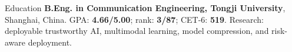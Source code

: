 \begin{rubric}{Education}
\entry*[2023 -- Present]%
  \textbf{B.Eng. in Communication Engineering, Tongji University}, Shanghai, China. GPA: \textbf{4.66/5.00}; rank: \textbf{3/87}; CET-6: \textbf{519}. Research: deployable trustworthy AI, multimodal learning, model compression, and risk-aware deployment.
\end{rubric}
